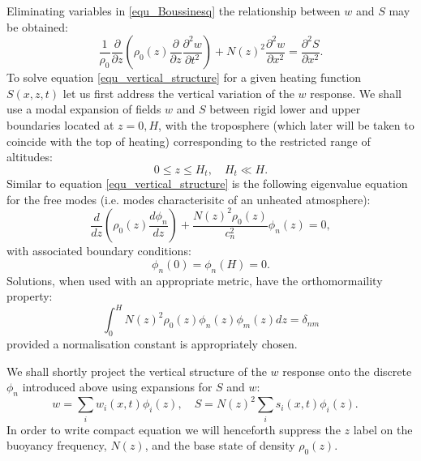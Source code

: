 \documentclass[a4paper,10pt]{article}
\begin{document}
Eliminating variables in \ref{equ_Boussinesq} the relationship between  $w$ and $S$ may be obtained:
%
\begin{equation}
\label{equ_vertical_structure}
\frac{1}{\rho_0} \frac{\partial}{\partial z} \left( \rho_0(z)  \frac{\partial}{\partial z} \frac{\partial^2 w}{\partial t^2} \right)  +N(z)^2 \frac{\partial^2 w}{\partial x^2} = \frac{\partial^2 S}{\partial x^2}.
\end{equation}
%
To solve equation \ref{equ_vertical_structure} for a given heating function $S(x,z,t)$ let us first address the vertical variation of the $w$ response. 
We shall use a modal expansion of fields $w$ and $S$ between rigid lower and upper boundaries located at
 $z=0,H$, with the troposphere (which later will be taken to coincide with the top of heating) corresponding to the restricted range of altitudes:
%
\begin{equation}
0 \leq z \leq H_t, \quad H_t \ll H.
\end{equation}
% 
Similar to equation \ref{equ_vertical_structure} is the following eigenvalue equation for the free modes (i.e. modes 
characterisitc of an unheated atmosphere):
%
\begin{equation}
\label{equ_free_modes}
\frac{d}{dz} \left( \rho_0(z) \frac{d \phi_n}{dz} \right) + \frac{N(z)^2 \rho_0(z)}{c_n^2} \phi_n(z) = 0,
\end{equation}
%
with associated boundary conditions:
%
\begin{equation}
\phi_n(0) = \phi_n(H) = 0.
\end{equation}
%
Solutions, when used with an appropriate metric, have the orthomormaility property:
%
\begin{equation}
\int_0^H N(z)^2 \rho_0(z)\phi_n(z) \phi_m(z) dz = \delta_{nm}
\end{equation}
%
provided a normalisation constant is appropriately chosen. 

We shall shortly project the vertical structure of the $w$ response onto the discrete $\phi_n$ introduced above using
expansions for $S$ and $w$:
%
\begin{equation}
\label{equ_modal}
w = \sum_i w_i(x,t) \phi_i(z), \quad S = N(z)^2 \sum_i s_i(x,t) \phi_i(z). \quad
\end{equation}
%
In order to write compact equation we will henceforth suppress the $z$ label on the buoyancy frequency, $N(z)$, and the base state of density $\rho_0(z)$.
\end{document}
